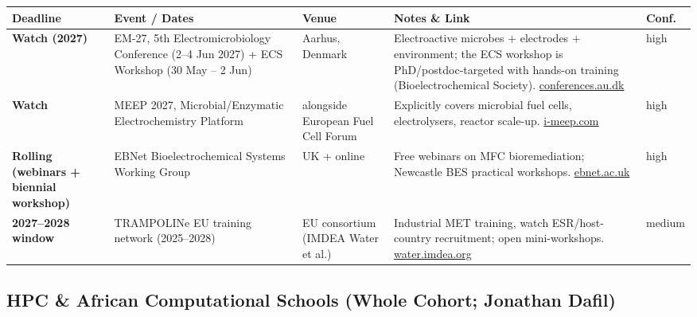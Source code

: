 \documentclass[11pt,a4paper]{article}
\begin{document}
\begin{longtable}{@{}p{3.2cm}p{3.0cm}p{2.5cm}p{5.2cm}p{1.6cm}@{}}
\toprule
\textbf{Deadline} & \textbf{Event / Dates} & \textbf{Venue} & \textbf{Notes \& Link} & \textbf{Conf.} \\
\midrule
\endhead
\textbf{Watch (2027)} & EM-27, 5th Electromicrobiology Conference (2--4 Jun 2027) + ECS Workshop (30 May -- 2 Jun) & Aarhus, Denmark & Electroactive microbes $+$ electrodes $+$ environment; the ECS workshop is PhD/postdoc-targeted with hands-on training (Bioelectrochemical Society). \href{https://conferences.au.dk/electromicrobiology-2027}{conferences.au.dk} & high \\
\midrule
\textbf{Watch} & MEEP 2027, Microbial/Enzymatic Electrochemistry Platform & alongside European Fuel Cell Forum & Explicitly covers microbial fuel cells, electrolysers, reactor scale-up. \href{https://www.i-meep.com/2027}{i-meep.com} & high \\
\midrule
\textbf{Rolling (webinars + biennial workshop)} & EBNet Bioelectrochemical Systems Working Group & UK + online & Free webinars on MFC bioremediation; Newcastle BES practical workshops. \href{https://ebnet.ac.uk/wg-details/wg-bes/}{ebnet.ac.uk} & high \\
\midrule
\textbf{2027--2028 window} & TRAMPOLINe EU training network (2025--2028) & EU consortium (IMDEA Water et al.) & Industrial MET training, watch ESR/host-country recruitment; open mini-workshops. \href{https://water.imdea.org/bioe-project/trampoline/}{water.imdea.org} & medium \\
\bottomrule
\end{longtable}

\subsection{HPC \& African Computational Schools (Whole Cohort; Jonathan Dafil)}
\end{document}
